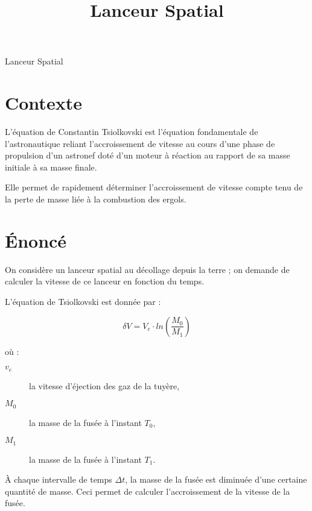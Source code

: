 \documentclass[french,a4paper,addpoints,11pt]{exam}
\title{Lanceur Spatial}
\begin{document}
\maketitle
\thispagestyle{headandfoot}

    \begin{questions}
        \begin{multicols}{2}
        \question Lanceur Spatial

        \section*{Contexte}

        L'équation de Constantin Tsiolkovski est l'équation fondamentale de l'astronautique reliant l'accroissement de vitesse au cours d'une phase de propulsion d'un astronef doté d'un moteur à réaction au rapport de sa masse initiale à sa masse finale.

        Elle permet de rapidement déterminer l'accroissement de vitesse compte tenu de la perte de masse liée à la combustion des ergols.
        \section*{Énoncé}

        On considère un lanceur spatial au décollage depuis la terre ; on demande de calculer la vitesse de ce lanceur en fonction du temps.

        L'équation de Tsiolkovski est donnée par :

        \begin{equation}
            \delta V = V_e \cdot ln(\frac{M_0}{M_1})
        \end{equation}

        où :

        \begin{description}
            \item[$v_e$] la vitesse d'éjection des gaz de la tuyère,
            \item[$M_0$] la masse de la fusée à l'instant $T_{0}$,
            \item[$M_1$] la masse de la fusée à l'instant $T_{1}$.
        \end{description}

        À chaque intervalle de temps $\Delta t$, la masse de la fusée est diminuée d'une certaine quantité de masse. Ceci permet de calculer l'accroissement de la vitesse de la fusée.


\end{multicols}
\end{questions}
\end{document}
